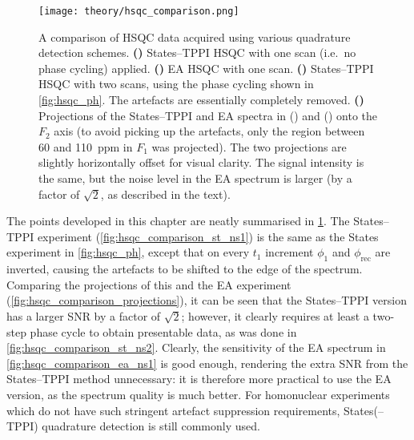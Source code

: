 \begin{figure}[htbp]
    \centering
    \texttt{[image: theory/hsqc\_comparison.png]}%
    {\label{fig:hsqc_comparison_st_ns1}}%
    {\label{fig:hsqc_comparison_ea_ns1}}%
    {\label{fig:hsqc_comparison_st_ns2}}%
    {\label{fig:hsqc_comparison_projections}}%
    \caption[Experimental comparison of States--TPPI and echo--antiecho HSQC]{
        A comparison of HSQC data acquired using various quadrature detection schemes.
        \textbf{()} States--TPPI HSQC with one scan (i.e.\ no phase cycling) applied.
        \textbf{()} EA HSQC with one scan.
        \textbf{()} States--TPPI HSQC with two scans, using the phase cycling shown in \cref{fig:hsqc_ph}. The artefacts are essentially completely removed.
        \textbf{()} Projections of the States--TPPI and EA spectra in () and () onto the $F_2$ axis (to avoid picking up the artefacts, only the region between 60 and \SI{110}{ppm} in $F_1$ was projected).
        The two projections are slightly horizontally offset for visual clarity.
        The signal intensity is the same, but the noise level in the EA spectrum is larger (by a factor of $\sqrt{2}$, as described in the text).
    }
    \label{fig:hsqc_comparison}
\end{figure}

The points developed in this chapter are neatly summarised in \cref{fig:hsqc_comparison}.
The States--TPPI experiment (\cref{fig:hsqc_comparison_st_ns1}) is the same as the States experiment in \cref{fig:hsqc_ph}, except that on every $t_1$ increment $\phi_1$ and $\phi_\text{rec}$ are inverted, causing the artefacts to be shifted to the edge of the spectrum.
Comparing the projections of this and the EA experiment (\cref{fig:hsqc_comparison_projections}), it can be seen that the States--TPPI version has a larger SNR by a factor of $\sqrt{2}$; however, it clearly requires at least a two-step phase cycle to obtain presentable data, as was done in \cref{fig:hsqc_comparison_st_ns2}.
Clearly, the sensitivity of the EA spectrum in \cref{fig:hsqc_comparison_ea_ns1} is good enough, rendering the extra SNR from the States--TPPI method unnecessary: it is therefore more practical to use the EA version, as the spectrum quality is much better.
For homonuclear experiments which do not have such stringent artefact suppression requirements, States(--TPPI) quadrature detection is still commonly used.

